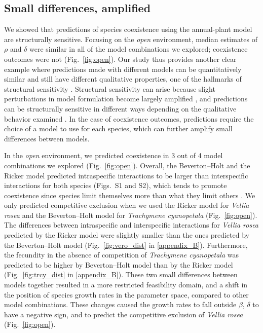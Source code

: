 \begin{refsection}

\subsection*{Small differences, amplified}

We showed that predictions of species coexistence using the annual-plant model are structurally sensitive. Focusing on the \textit{open} environment, median estimates of $\rho$ and $\delta$  were similar in all of the model combinations we explored; coexistence outcomes were not (Fig.~\ref{fig:open}). Our study thus provides another clear example where predictions made with different models can be quantitatively similar and still have different qualitative properties, one of the hallmarks of structural sensitivity \citep{flora_structural_2011}.  Structural sensitivity can arise because slight perturbations in model formulation become largely amplified \citep{flora_structural_2011, wood1999super}, and predictions can be structurally sensitive in different ways depending on the qualitative behavior examined \citep{flora_structural_2011, aldebert2018community}. In the case of coexistence outcomes, predictions require the choice of a model to use for each species, which can further amplify small differences between models.

In the \textit{open} environment, we predicted coexistence in 3 out of 4 model combinations we explored (Fig.~\ref{fig:open}). Overall, the Beverton--Holt and the Ricker model predicted intraspecific interactions to be larger than interspecific interactions for both species (Figs.~S1 and S2), which tends to promote coexistence since species limit themselves more than what they limit others \citep{chesson_general_2000}. We only predicted competitive exclusion when we used the Ricker model for \textit{Vellia rosea} and the Beverton--Holt model for \textit{Trachymene cyanopetala} (Fig.~\ref{fig:open}). The differences between intraspecific and interspecific interactions for \textit{Vellia rosea} predicted by the Ricker model were slightly smaller than the ones predicted by the Beverton--Holt model (Fig.~\ref{fig:vero_dist} in \autoref{appendix_B}). Furthermore, the fecundity in the absence of competition of \textit{Trachymene cyanopetala} was predicted to be higher by Beverton--Holt model than by the Ricker model (Fig.~\ref{fig:trcy_dist} in \autoref{appendix_B}). These two small differences between models together resulted in a more restricted feasibility domain, and a shift in the position of species growth rates in the parameter space, compared to other model combinations. These changes caused the growth rates to fall outside $\beta$, $\delta$ to have a negative sign, and to predict the competitive exclusion of \textit{Vellia rosea} (Fig.~\ref{fig:open}).


\end{refsection}
